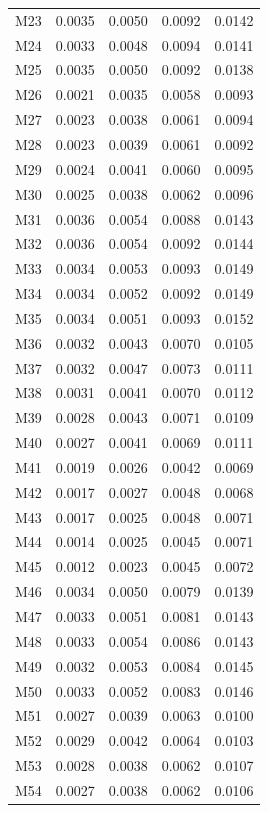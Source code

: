 \begin{longtable}{lrrrr}
M23 & 0.0035 & 0.0050 & 0.0092 & 0.0142 \\
M24 & 0.0033 & 0.0048 & 0.0094 & 0.0141 \\
M25 & 0.0035 & 0.0050 & 0.0092 & 0.0138 \\
M26 & 0.0021 & 0.0035 & 0.0058 & 0.0093 \\
M27 & 0.0023 & 0.0038 & 0.0061 & 0.0094 \\
M28 & 0.0023 & 0.0039 & 0.0061 & 0.0092 \\
M29 & 0.0024 & 0.0041 & 0.0060 & 0.0095 \\
M30 & 0.0025 & 0.0038 & 0.0062 & 0.0096 \\
M31 & 0.0036 & 0.0054 & 0.0088 & 0.0143 \\
M32 & 0.0036 & 0.0054 & 0.0092 & 0.0144 \\
M33 & 0.0034 & 0.0053 & 0.0093 & 0.0149 \\
M34 & 0.0034 & 0.0052 & 0.0092 & 0.0149 \\
M35 & 0.0034 & 0.0051 & 0.0093 & 0.0152 \\
M36 & 0.0032 & 0.0043 & 0.0070 & 0.0105 \\
M37 & 0.0032 & 0.0047 & 0.0073 & 0.0111 \\
M38 & 0.0031 & 0.0041 & 0.0070 & 0.0112 \\
M39 & 0.0028 & 0.0043 & 0.0071 & 0.0109 \\
M40 & 0.0027 & 0.0041 & 0.0069 & 0.0111 \\
M41 & 0.0019 & 0.0026 & 0.0042 & 0.0069 \\
M42 & 0.0017 & 0.0027 & 0.0048 & 0.0068 \\
M43 & 0.0017 & 0.0025 & 0.0048 & 0.0071 \\
M44 & 0.0014 & 0.0025 & 0.0045 & 0.0071 \\
M45 & 0.0012 & 0.0023 & 0.0045 & 0.0072 \\
M46 & 0.0034 & 0.0050 & 0.0079 & 0.0139 \\
M47 & 0.0033 & 0.0051 & 0.0081 & 0.0143 \\
M48 & 0.0033 & 0.0054 & 0.0086 & 0.0143 \\
M49 & 0.0032 & 0.0053 & 0.0084 & 0.0145 \\
M50 & 0.0033 & 0.0052 & 0.0083 & 0.0146 \\
M51 & 0.0027 & 0.0039 & 0.0063 & 0.0100 \\
M52 & 0.0029 & 0.0042 & 0.0064 & 0.0103 \\
M53 & 0.0028 & 0.0038 & 0.0062 & 0.0107 \\
M54 & 0.0027 & 0.0038 & 0.0062 & 0.0106 \\

\end{longtable}
